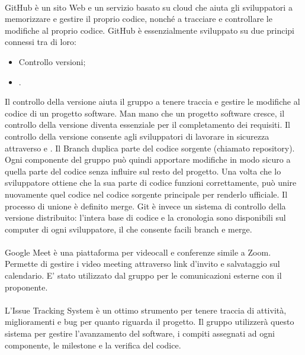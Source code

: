 \paragraph{}
GitHub è un sito Web e un servizio basato su cloud che aiuta gli sviluppatori a memorizzare e gestire il proprio codice, nonché a tracciare e controllare le modifiche al proprio codice. GitHub è essenzialmente sviluppato su due principi connessi tra di loro:
\begin{itemize}
    \item Controllo versioni;
    \item {}.
\end{itemize}
Il controllo della versione aiuta il gruppo a tenere traccia e gestire le modifiche al codice di un progetto software. Man mano che un progetto software cresce, il controllo della versione diventa essenziale per il completamento dei requisiti. Il controllo della versione consente agli sviluppatori di lavorare in sicurezza attraverso  e . Il Branch duplica parte del codice sorgente (chiamato repository). Ogni componente del gruppo può quindi apportare modifiche in modo sicuro a quella parte del codice senza influire sul resto del progetto. Una volta che lo sviluppatore ottiene che la sua parte di codice funzioni correttamente, può unire nuovamente quel codice nel codice sorgente principale per renderlo ufficiale. Il processo di unione è definito merge.
Git è invece un sistema di controllo della versione distribuito: l'intera base di codice e la cronologia sono disponibili sul computer di ogni sviluppatore, il che consente facili branch e merge.

\paragraph{}
Google Meet è una piattaforma per videocall e conferenze simile a Zoom. Permette di gestire i video meeting attraverso link d'invito e salvataggio sul calendario. E' stato utilizzato dal gruppo per le comunicazioni esterne con il proponente.

\paragraph{}
L'Issue Tracking System è un ottimo strumento per tenere traccia di attività, miglioramenti e bug per quanto riguarda il progetto. Il gruppo utilizzerà questo sistema per gestire l'avanzamento del software, i compiti assegnati ad ogni componente, le milestone e la verifica del codice.

